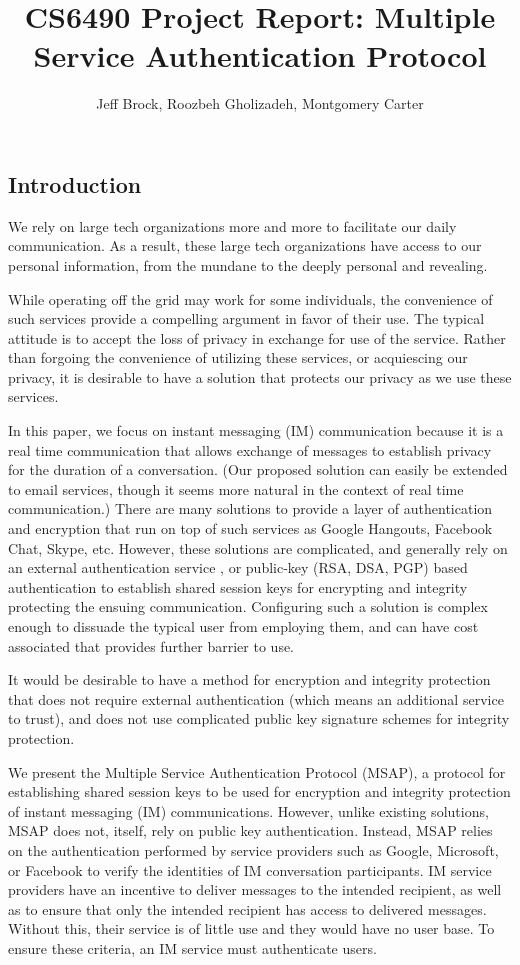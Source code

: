 \documentclass[twoside,10pt]{article}
\title{CS6490 Project Report: Multiple Service Authentication Protocol}
\author{Jeff Brock, Roozbeh Gholizadeh, Montgomery Carter}
\date{}
\begin{document}
\maketitle
\newpage
\begin{multicols}{2}

\section{Introduction}
We rely on large tech organizations more and more to facilitate our daily communication.  As a result, these large tech organizations have access to our personal information, from the mundane to the deeply personal and revealing.

While operating off the grid may work for some individuals, the convenience of such services provide a compelling argument in favor of their use.  The typical attitude is to accept the loss of privacy in exchange for use of the service.  Rather than forgoing the convenience of utilizing these services, or acquiescing our privacy, it is desirable to have a solution that protects our privacy as we use these services.

In this paper, we focus on instant messaging (IM) communication because it is a real time communication that allows exchange of messages to establish privacy for the duration of a conversation.  (Our proposed solution can easily be extended to email services, though it seems more natural in the context of real time communication.)  There are many solutions to provide a layer of authentication and encryption that run on top of such services as Google Hangouts, Facebook Chat, Skype, etc.  However, these solutions are complicated, and generally rely on an external authentication service \cite{DiRaimondo:2005:SOM:1102199.1102216}, or public-key (RSA, DSA, PGP) based authentication to establish shared session keys for encrypting and integrity protecting the ensuing communication.  Configuring such a solution is complex enough to dissuade the typical user from employing them, and can have cost associated that provides further barrier to use.

It would be desirable to have a method for encryption and integrity protection that does not require external authentication (which means an additional service to trust), and does not use complicated public key signature schemes for integrity protection.

We present the Multiple Service Authentication Protocol (MSAP), a protocol for establishing shared session keys to be used for encryption and integrity protection of instant messaging (IM) communications.  However, unlike existing solutions, MSAP does not, itself, rely on public key authentication.  Instead, MSAP relies on the authentication performed by service providers such as Google, Microsoft, or Facebook to verify the identities of IM conversation participants.  IM service providers have an incentive to deliver messages to the intended recipient, as well as to ensure that only the intended recipient has access to delivered messages.  Without this, their service is of little use and they would have no user base.  To ensure these criteria, an IM service must authenticate users.


\end{multicols}
\end{document}
